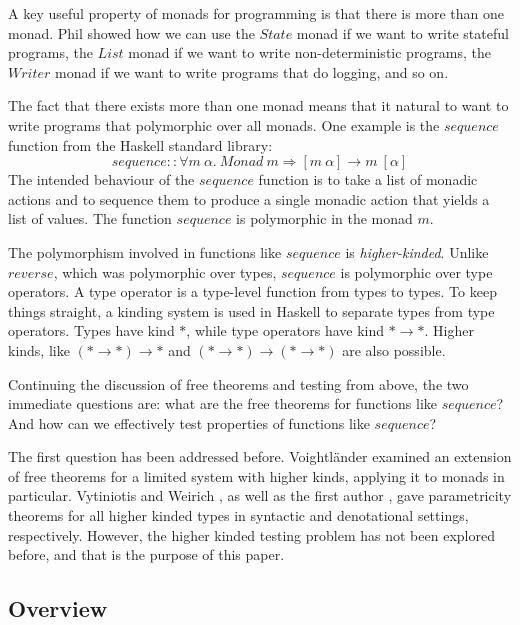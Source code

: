 \documentclass{llncs}
\begin{document}
A key useful property of monads for programming is that there is more
than one monad. Phil showed how we can use the $\mathit{State}$ monad
if we want to write stateful programs, the $\mathit{List}$ monad if we
want to write non-deterministic programs, the $\mathit{Writer}$ monad
if we want to write programs that do logging, and so on.

The fact that there exists more than one monad means that it natural
to want to write programs that polymorphic over all monads. One
example is the $\mathit{sequence}$ function from the Haskell standard
library:
\begin{displaymath}
  \mathit{sequence} :: \forall m~\alpha.~\mathit{Monad}~m \Rightarrow [m~\alpha] \to m~[\alpha]
\end{displaymath}
The intended behaviour of the $\mathit{sequence}$ function is to take
a list of monadic actions and to sequence them to produce a single
monadic action that yields a list of values. The function
$\mathit{sequence}$ is polymorphic in the monad $m$.

The polymorphism involved in functions like $\mathit{sequence}$ is
\emph{higher-kinded}. Unlike $\mathit{reverse}$, which was polymorphic
over types, $\mathit{sequence}$ is polymorphic over type operators. A
type operator is a type-level function from types to types. To keep
things straight, a kinding system is used in Haskell to separate types
from type operators. Types have kind $*$, while type operators have
kind $* \to *$. Higher kinds, like $(* \to *) \to *$ and
$(* \to *) \to (* \to *)$ are also possible.

Continuing the discussion of free theorems and testing from above, the
two immediate questions are: what are the free theorems for functions
like $\mathit{sequence}$? And how can we effectively test properties
of functions like $\mathit{sequence}$?

The first question has been addressed before. Voightl{\"a}nder
\cite{DBLP:journals/jfp/VytiniotisW10} examined an extension of free
theorems for a limited system with higher kinds, applying it to monads
in particular. Vytiniotis and Weirich
\cite{DBLP:journals/jfp/VytiniotisW10}, as well as the first author
\cite{atkey12relational}, gave parametricity theorems for all higher
kinded types in syntactic and denotational settings,
respectively. However, the higher kinded testing problem has not been
explored before, and that is the purpose of this paper.

\subsection{Overview}
\end{document}
